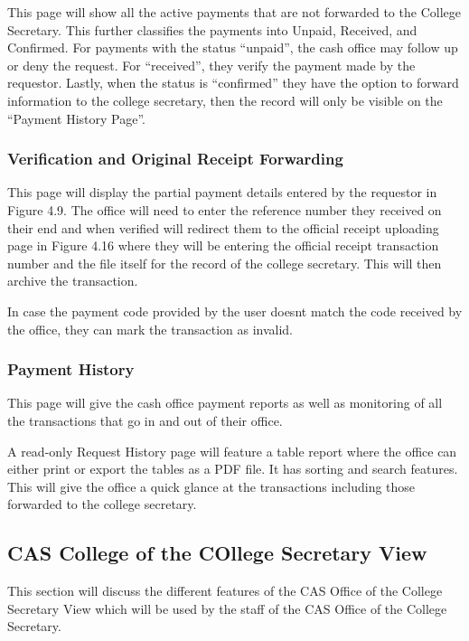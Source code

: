 This page will show all the active payments that are not forwarded to the College Secretary. This further classifies the payments into Unpaid, Received, and Confirmed. For payments with the status “unpaid”, the cash office may follow up or deny the request. For “received”, they verify the payment made by the requestor. Lastly, when the status is “confirmed”  they have the option to forward information to the college secretary, then the record will only be visible on the “Payment History Page”.

\subsubsection{Verification and Original Receipt Forwarding}

This page will display the partial payment details entered by the requestor in Figure 4.9. The office will need to enter the reference number they received on their end and when verified will redirect them to the official receipt uploading page in Figure 4.16 where they will be entering the official receipt transaction number and the file itself for the record of the college secretary. This will then archive the transaction.

In case the payment code provided by the user doesn\textsc{}t match the code received by the office, they can mark the transaction as invalid.

\subsubsection{Payment History}

This page will give the cash office payment reports as well as monitoring of all the transactions that go in and out of their office.

A read-only  Request History page will feature a table report where the office can either print or export the tables as a PDF file. It has sorting and search features. This will give the office a quick glance at the transactions including those forwarded to the college secretary.


\subsection{CAS College of the COllege Secretary View}

This section will discuss the different features of the CAS Office of the College Secretary View which will be used by the staff of the CAS Office of the College Secretary.



